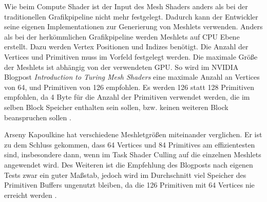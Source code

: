 Wie beim Compute Shader ist der Input des Mesh Shaders anders als bei der traditionellen Grafikpipeline nicht mehr festgelegt.
Dadurch kann der Entwickler seine eigenen Implementationen zur Generierung von Meshlets verwenden.
Anders als bei der herkömmlichen Grafikpipeline werden Meshlets auf CPU Ebene erstellt.
Dazu werden Vertex Positionen und Indizes benötigt.
Die Anzahl der Vertices und Primitiven muss im Vorfeld festgelegt werden.
Die maximale Größe der Meshlets ist abhängig von der verwendeten GPU.
So wird im NVIDIA Blogpost \textit{Introduction to Turing Mesh Shaders} eine maximale Anzahl an Vertices von 64, und Primitiven von 126 empfohlen.
Es werden 126 statt 128 Primitiven empfohlen, da 4 Byte für die Anzahl der Primitiven verwendet werden, die im selben Block Speicher enthalten sein sollen, bzw. keinen weiteren Block beanspruchen sollen \cite{Kubisch2018}. \newline

Arseny Kapoulkine hat verschiedene Meshletgrößen miteinander verglichen.
Er ist zu dem Schluss gekommen, dass 64 Vertices und 84 Primitives am effizientesten sind, insbesondere dann, wenn im Task Shader Culling auf die einzelnen Meshlets angewendet wird.
Des Weiteren ist die Empfehlung des Blogposts nach eigenen Tests zwar ein guter Maßstab, jedoch wird im Durchschnitt viel Speicher des Primitiven Buffers ungenutzt bleiben, da die 126 Primitiven mit 64 Vertices nie erreicht werden \cite{Kapoulkine2023}.

